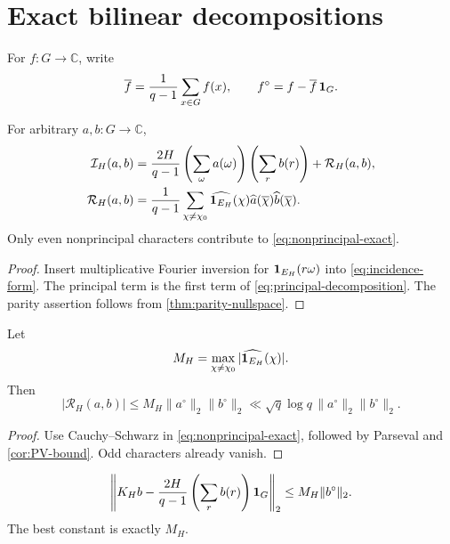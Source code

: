 \section{Exact bilinear decompositions}
\label{sec:bilinear-bounds}

For \(f:G\to\mathbb C\), write
\[
 \overline f=\frac1{q-1}\sum_{x\in G}f(x),
 \qquad
 f^\circ=f-\overline f\,\mathbf 1_G.
\]

\begin{theorem}
\label{thm:principal-nonprincipal}
For arbitrary \(a,b:G\to\mathbb C\),
\begin{align}
 \mathcal I_H(a,b)
 ={}&
 \frac{2H}{q-1}
 \left(\sum_\omega a(\omega)\right)
 \left(\sum_r b(r)\right)
 +\mathcal R_H(a,b),
\label{eq:principal-decomposition}\\
 \mathcal R_H(a,b)
 ={}&
 \frac1{q-1}
 \sum_{\chi\ne\chi_0}
 \widehat{\mathbf 1_{E_H}}(\chi)
 \widehat a(\overline\chi)
 \widehat b(\overline\chi).
\label{eq:nonprincipal-exact}
\end{align}
Only even nonprincipal characters contribute to
\eqref{eq:nonprincipal-exact}.
\end{theorem}

\begin{proof}
Insert multiplicative Fourier inversion for
\(\mathbf 1_{E_H}(r\omega)\) into
\eqref{eq:incidence-form}.  The principal term is the first term of
\eqref{eq:principal-decomposition}.  The parity assertion follows
from \cref{thm:parity-nullspace}.
\end{proof}

\begin{corollary}
\label{cor:spectral-bound}
Let
\[
 M_H=\max_{\chi\ne\chi_0}
 |\widehat{\mathbf 1_{E_H}}(\chi)|.
\]
Then
\begin{equation}
 |\mathcal R_H(a,b)|
 \le
 M_H\|a^\circ\|_2\|b^\circ\|_2
 \ll
 \sqrt q\log q\,
 \|a^\circ\|_2\|b^\circ\|_2.
\label{eq:spectral-bilinear-bound}
\end{equation}
\end{corollary}

\begin{proof}
Use Cauchy--Schwarz in \eqref{eq:nonprincipal-exact}, followed by
Parseval and \cref{cor:PV-bound}.  Odd characters already vanish.
\end{proof}

\begin{proposition}
\label{prop:centered-operator}
\[
 \left\|
 K_Hb-\frac{2H}{q-1}
 \left(\sum_rb(r)\right)\mathbf 1_G
 \right\|_2
 \le M_H\|b^\circ\|_2.
\]
The best constant is exactly \(M_H\).
\end{proposition}

